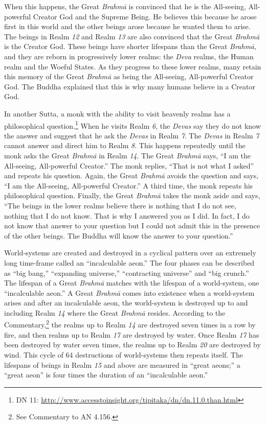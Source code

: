 When this happens, the Great \textit{Brahmā} is convinced that he is the All-seeing, All-powerful Creator God and the Supreme Being. He believes this because he arose first in this world and the other beings arose because he wanted them to arise. The beings in Realm \textit{12} and Realm \textit{13} are also convinced that the Great \textit{Brahmā} is the Creator God. These beings have shorter lifespans than the Great \textit{Brahmā}, and they are reborn in progressively lower realms: the \textit{Deva} realms, the Human realm and the Woeful States. As they progress to these lower realms, many retain this memory of the Great \textit{Brahmā} as being the All-seeing, All-powerful Creator God. The Buddha explained that this is why many humans believe in a Creator God.

In another Sutta, a monk with the ability to visit heavenly realms has a philosophical question.\footnote{DN 11: \url{http://www.accesstoinsight.org/tipitaka/dn/dn.11.0.than.html}} When he visits Realm \textit{6}, the \textit{Devas} say they do not know the answer and suggest that he ask the \textit{Devas} in Realm \textit{7}. The \textit{Devas} in Realm \textit{7} cannot answer and direct him to Realm \textit{8}. This happens repeatedly until the monk asks the Great \textit{Brahmā} in Realm \textit{14}. The Great \textit{Brahmā} says, “I am the All-seeing, All-powerful Creator.” The monk replies, “That is not what I asked” and repeats his question. Again, the Great \textit{Brahmā} avoids the question and says, “I am the All-seeing, All-powerful Creator.” A third time, the monk repeats his philosophical question. Finally, the Great \textit{Brahmā} takes the monk aside and says, “The beings in the lower realms believe there is nothing that I do not see, nothing that I do not know. That is why I answered you as I did. In fact, I do not know that answer to your question but I could not admit this in the presence of the other beings. The Buddha will know the answer to your question.”

World-systems are created and destroyed in a cyclical pattern over an extremely long time-frame called an “incalculable aeon.” The four phases can be described as “big bang,” “expanding universe,” “contracting universe” and “big crunch.” The lifespan of a Great \textit{Brahmā} matches with the lifespan of a world-system, one “incalculable aeon.” A Great \textit{Brahmā} comes into existence when a world-system arises and after an incalculable aeon, the world-system is destroyed up to and including Realm \textit{14} where the Great \textit{Brahmā} resides. According to the Commentary,\footnote{See Commentary to AN 4.156.} the realms up to Realm \textit{14} are destroyed seven times in a row by fire, and then realms up to Realm \textit{17} are destroyed by water. Once Realm \textit{17} has been destroyed by water seven times, the realms up to Realm \textit{20} are destroyed by wind. This cycle of 64 destructions of world-systems then repeats itself. The lifespans of beings in Realm \textit{15} and above are measured in “great aeons;” a “great aeon” is four times the duration of an “incalculable aeon.”

